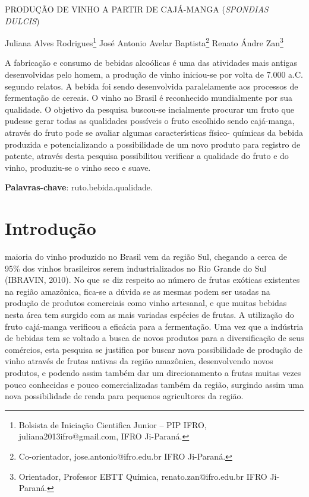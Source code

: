 \documentclass[article,12pt,onesidea,4paper,english,brazil]{abntex2}
\begin{document}
	
	
	\frenchspacing 
	
	\begin{center}
		\LARGE PRODUÇÃO DE VINHO A PARTIR DE CAJÁ-MANGA (\textit{SPONDIAS DULCIS})
		
		\normalsize
		Juliana Alves Rodrigues\footnote{Bolsista de Iniciação Cientifica Junior – PIP IFRO, juliana2013ifro@gmail.com, IFRO Ji-Paraná.} 
		José Antonio Avelar Baptista\footnote{Co-orientador, jose.antonio@ifro.edu.br IFRO Ji-Paraná.} 
		Renato Ándre Zan\footnote{Orientador, Professor EBTT Química, renato.zan@ifro.edu.br IFRO Ji-Paraná.}  
	\end{center}
	
	\begin{resumoumacoluna}
		A fabricação e consumo de bebidas alcoólicas é uma das atividades mais antigas desenvolvidas pelo homem, a produção de vinho iniciou-se por volta de
		7.000 a.C. segundo relatos. A bebida foi sendo desenvolvida paralelamente aos processos de fermentação de cereais. O vinho no Brasil é reconhecido mundialmente por sua qualidade. O objetivo da pesquisa buscou-se incialmente procurar um fruto que pudesse gerar todas as qualidades possíveis o fruto escolhido sendo cajá-manga, através do fruto pode se avaliar algumas características físico- químicas da bebida produzida e potencializando a possibilidade de um novo produto para registro de patente, através desta pesquisa possibilitou verificar a qualidade do fruto e do vinho, produziu-se o vinho seco e suave.
		
		\vspace{\onelineskip}
		
		\noindent
		\textbf{Palavras-chave}: ruto.bebida.qualidade.
	\end{resumoumacoluna}
	
	\textual
	
	\section*{Introdução}
	
	maioria do vinho produzido no Brasil vem da região Sul, chegando a cerca de 95\% dos vinhos brasileiros serem industrializados no Rio Grande do Sul (IBRAVIN, 2010). No que se diz respeito ao número de frutas exóticas existentes na região amazônica, fica-se a dúvida se as mesmas podem ser usadas na produção de produtos comerciais como vinho artesanal, e que muitas bebidas nesta área tem surgido com as mais variadas espécies de frutas. A utilização do fruto cajá-manga verificou a eficácia para a fermentação.
	Uma vez que a indústria de bebidas tem se voltado a busca de novos produtos para a diversificação de seus comércios, esta pesquisa se justifica por buscar nova possibilidade de produção de vinho através de frutas nativas da região amazônica, desenvolvendo novos produtos, e podendo assim também dar um direcionamento a frutas muitas vezes pouco conhecidas e pouco comercializadas também da região, surgindo assim uma nova possibilidade de renda para pequenos agricultores da região.
	
\end{document}
